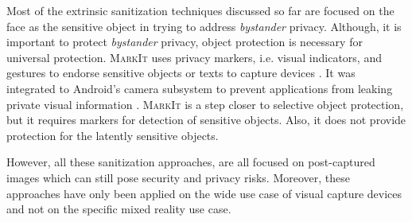 Most of the extrinsic sanitization techniques discussed so far are focused on the face as the sensitive object in trying to address \textit{bystander} privacy. Although, it is important to protect \textit{bystander} privacy, object protection is necessary for universal protection. \textsc{MarkIt} uses privacy markers, i.e. visual indicators, and gestures to endorse sensitive objects or texts to capture devices \cite{raval2014markit}. It was integrated to Android's camera subsystem to prevent applications from leaking private visual information \cite{raval2016you}. \textsc{MarkIt} is a step closer to selective object protection, but it requires markers for detection of sensitive objects. Also, it does not provide protection for the latently sensitive objects.

However, all these sanitization approaches, are all focused on post-captured images which can still pose security and privacy risks. Moreover, these approaches have only been applied on the wide use case of visual capture devices and not on the specific mixed reality use case.


